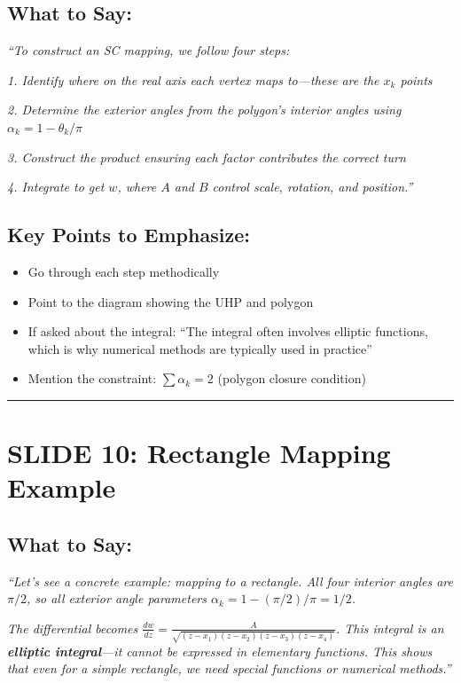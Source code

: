 \documentclass[12pt,a4paper]{article}
\begin{document}
\subsection*{What to Say:}
\begin{quotebox}
\textit{``To construct an SC mapping, we follow four steps:}

\textit{1. Identify where on the real axis each vertex maps to---these are the $x_k$ points}

\textit{2. Determine the exterior angles from the polygon's interior angles using $\alpha_k = 1 - \theta_k/\pi$}

\textit{3. Construct the product ensuring each factor contributes the correct turn}

\textit{4. Integrate to get $w$, where $A$ and $B$ control scale, rotation, and position.''}
\end{quotebox}

\subsection*{Key Points to Emphasize:}
\begin{itemize}[leftmargin=*]
    \item Go through each step methodically
    \item Point to the diagram showing the UHP and polygon
    \item If asked about the integral: ``The integral often involves elliptic functions, which is why numerical methods are typically used in practice''
    \item Mention the constraint: $\sum\alpha_k = 2$ (polygon closure condition)
\end{itemize}

\vspace{10pt}
\hrule
\vspace{10pt}

\section*{SLIDE 10: Rectangle Mapping Example}

\subsection*{What to Say:}
\begin{quotebox}
\textit{``Let's see a concrete example: mapping to a rectangle. All four interior angles are $\pi/2$, so all exterior angle parameters $\alpha_k = 1 - (\pi/2)/\pi = 1/2$.}

\textit{The differential becomes $\frac{dw}{dz} = \frac{A}{\sqrt{(z-x_1)(z-x_2)(z-x_3)(z-x_4)}}$. This integral is an \textbf{elliptic integral}---it cannot be expressed in elementary functions. This shows that even for a simple rectangle, we need special functions or numerical methods.''}
\end{quotebox}
\end{document}
